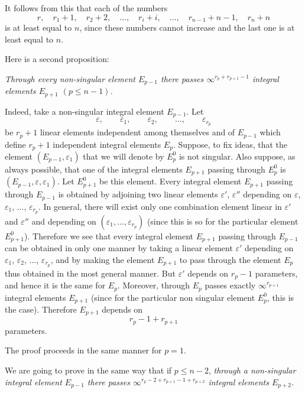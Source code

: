 \documentclass[leqno,11pt]{book}
\makeatletter
\theoremstyle{shape1}
\theoremstyle{shapesmall}
\let\old@epsilon\epsilon
\let\old@varepsilon\varepsilon
\let\epsilon\old@varepsilon
\let\varepsilon\old@epsilon
\newcommand{\somespace}{\vspace{9pt}}
\makeatother
\begin{document}
It follows from this that each of the numbers
\[
r,\quad r_{1}+1,\quad r_{2}+2,\quad\dots,\quad r_{i}+i,\quad\dots,\quad r_{n-1}+n-1,\quad r_{n}+n
\]
is at least equal to $n$, since these numbers cannot increase and the last one is at least equal to $n$.

Here is a second proposition:

\somespace

\emph{Through every non-singular element $E_{p-1}$ there passes $\infty^{r_{p}+r_{p+1}-1}$ integral elements $E_{p+1}$ $(p\le n-1)$.}

\somespace

Indeed, take a non-singular integral element $E_{p-1}$. Let
\[
\epsilon,\qquad\epsilon_{1},\qquad\epsilon_{2},\qquad\dots,\qquad\epsilon_{r_{p}}
\]
be $r_{p}+1$ linear elements independent among themselves and of $E_{p-1}$ which define $r_{p}+1$ independent integral elements $E_{p}$. Suppose, to fix ideas, that the element $(E_{p-1},\epsilon_{1})$ that we will denote by $E_{p}^{0}$ is not singular. Also suppose, as always possible, that one of the integral elements $E_{p+1}$ passing through $E_{p}^{0}$ is $(E_{p-1},\epsilon,\epsilon_{1})$. Let $E_{p+1}^{0}$ be this element. Every integral element $E_{p+1}$ passing through $E_{p-1}$ is obtained by adjoining two linear elements $\epsilon'$, $\epsilon''$ depending on $\epsilon$, $\epsilon_{1}$, $\dots$, $\epsilon_{r_{p}}$. In general, there will exist only one combination element linear in $\epsilon'$ and $\epsilon''$ and depending on $(\epsilon_{1},\dots,\epsilon_{r_{p}})$ (since this is so for the particular element $E_{p+1}^{0}$). Therefore we see that every integral element $E_{p+1}$ passing through $E_{p-1}$ can be obtained in only one manner by taking a linear element $\epsilon'$ depending on $\epsilon_{1}$, $\epsilon_{2}$, $\dots$, $\epsilon_{r_{p}}$, and by making the element $E_{p+1}$ to pass through the element $E_{p}$ thus obtained in the most general manner. But $\epsilon'$ depends on $r_{p}-1$ parameters, and hence it is the same for $E_{p}$. Moreover, through $E_{p}$ passes exactly $\infty^{r_{p+1}}$ integral elements $E_{p+1}$ (since for the particular non singular element $E_{p}^{0}$, this is the case). Therefore $E_{p+1}$ depends on
\[
r_{p}-1+r_{p+1}
\]
parameters.

The proof proceeds in the same manner for $p=1$.

We are going to prove in the same way that if $p\le n-2$, \emph{through a non-singular integral element $E_{p-1}$ there passes $\infty^{r_{p}-2+r_{p+1}-1+r_{p+2}}$ integral elements $E_{p+2}$.}
\end{document}
